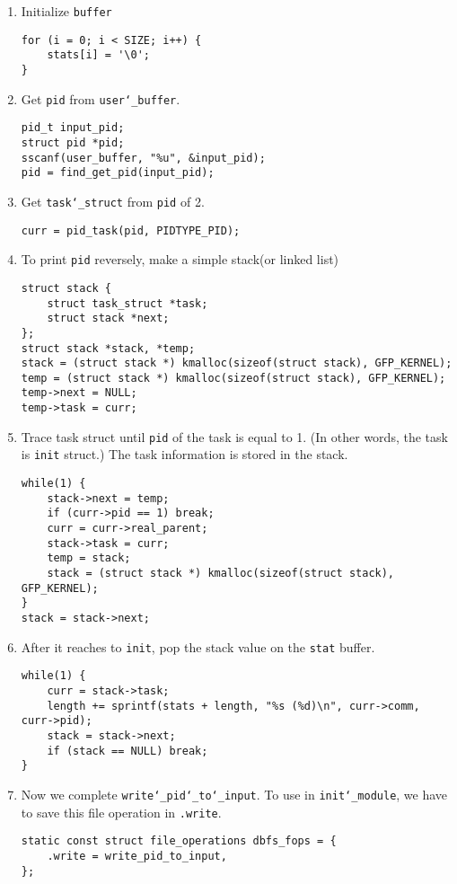 \begin{enumerate}
\item Initialize \texttt{buffer}
\begin{lstlisting}
for (i = 0; i < SIZE; i++) {
    stats[i] = '\0';
}
\end{lstlisting}

\item Get \texttt{pid} from \texttt{user\char`_buffer}.
\begin{lstlisting}
pid_t input_pid;
struct pid *pid;
sscanf(user_buffer, "%u", &input_pid);
pid = find_get_pid(input_pid);
\end{lstlisting}


\item Get \texttt{task\char`_struct} from \texttt{pid} of 2.
\begin{lstlisting}
curr = pid_task(pid, PIDTYPE_PID);
\end{lstlisting}

\item To print \texttt{pid} reversely, make a simple stack(or linked list)
\begin{lstlisting}
struct stack {
    struct task_struct *task;
    struct stack *next;
};
struct stack *stack, *temp;
stack = (struct stack *) kmalloc(sizeof(struct stack), GFP_KERNEL);
temp = (struct stack *) kmalloc(sizeof(struct stack), GFP_KERNEL);
temp->next = NULL;
temp->task = curr;
\end{lstlisting}

\item Trace task struct until \texttt{pid} of the task is equal to 1. (In other words, the task is \texttt{init} struct.)
The task information is stored in the stack.
\begin{lstlisting}
while(1) {
    stack->next = temp;
    if (curr->pid == 1) break;
    curr = curr->real_parent;
    stack->task = curr;
    temp = stack;
    stack = (struct stack *) kmalloc(sizeof(struct stack), GFP_KERNEL);
}
stack = stack->next;
\end{lstlisting}

\item After it reaches to \texttt{init}, pop the stack value on the \texttt{stat} buffer.
\begin{lstlisting}
while(1) {
    curr = stack->task;
    length += sprintf(stats + length, "%s (%d)\n", curr->comm, curr->pid);
    stack = stack->next;
    if (stack == NULL) break;
}
\end{lstlisting}

\item Now we complete \texttt{write\char`_pid\char`_to\char`_input}. To use in \texttt{init\char`_module}, we have to save this file operation in \texttt{.write}.
\begin{lstlisting}
static const struct file_operations dbfs_fops = {
    .write = write_pid_to_input,
};
\end{lstlisting}


\end{enumerate}
